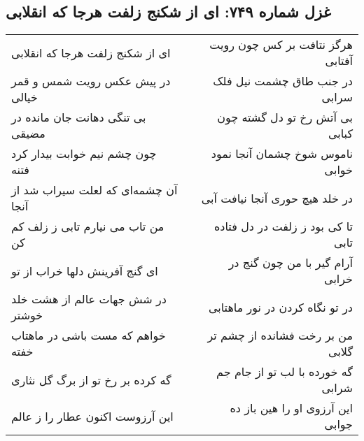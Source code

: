 \begin{center}
\section*{غزل شماره ۷۴۹: ای از شکنج زلفت هرجا که انقلابی}
\label{sec:749}
\begin{longtable}{l p{0.5cm} r}
ای از شکنج زلفت هرجا که انقلابی
&&
هرگز نتافت بر کس چون رویت آفتابی
\\
در پیش عکس رویت شمس و قمر خیالی
&&
در جنب طاق چشمت نیل فلک سرابی
\\
بی تنگی دهانت جان مانده در مضیقی
&&
بی آتش رخ تو دل گشته چون کبابی
\\
چون چشم نیم خوابت بیدار کرد فتنه
&&
ناموس شوخ چشمان آنجا نمود خوابی
\\
آن چشمه‌ای که لعلت سیراب شد از آنجا
&&
در خلد هیچ حوری آنجا نیافت آبی
\\
من تاب می نیارم تابی ز زلف کم کن
&&
تا کی بود ز زلفت در دل فتاده تابی
\\
ای گنج آفرینش دلها خراب از تو
&&
آرام گیر با من چون گنج در خرابی
\\
در شش جهات عالم از هشت خلد خوشتر
&&
در تو نگاه کردن در نور ماهتابی
\\
خواهم که مست باشی در ماهتاب خفته
&&
من بر رخت فشانده از چشم تر گلابی
\\
گه کرده بر رخ تو از برگ گل نثاری
&&
گه خورده با لب تو از جام جم شرابی
\\
این آرزوست اکنون عطار را ز عالم
&&
این آرزوی او را هین باز ده جوابی
\\
\end{longtable}
\end{center}
